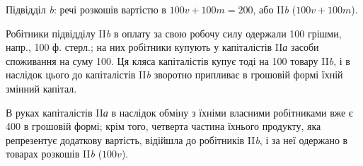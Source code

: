 Підвідділ \emph{b}: речі розкошів вартістю в $100 v + 100 m = 200$, або
II\emph{b} ($100 v + 100 m$).

Робітники підвідділу II\emph{b} в оплату за свою робочу силу одержали
100 грішми, напр., 100 ф. стерл.; на них робітники купують у капіталістів
II\emph{а} засоби споживання на суму 100. Ця кляса капіталістів купує
тоді на 100 товару II\emph{b}, і в наслідок цього до капіталістів II\emph{b} зворотно
припливає в грошовій формі їхній змінний капітал.

В руках капіталістів II\emph{а} в наслідок обміну з їхніми власними робітниками
вже є 400 в грошовій формі; крім того, четверта частина їхнього
продукту, яка репрезентує додаткову вартість, відійшла до робітників
II\emph{b}, і за неї одержано в товарах розкошів II\emph{b} ($100 v$).

